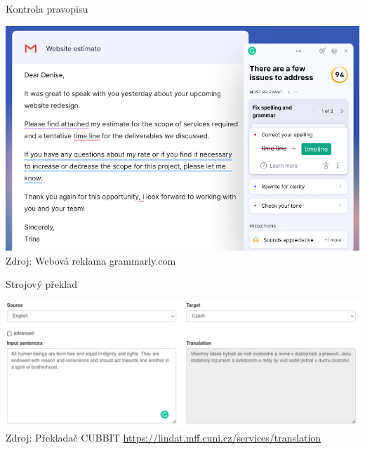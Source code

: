 \documentclass[aspectratio=169,dvipsnames]{beamer}
\begin{document}

\begin{frame}{Kontrola pravopisu}

    \centering
    \includegraphics[scale=.3]{img/grammarly.png} \\
    {\tiny Zdroj: Webová reklama grammarly.com}

\end{frame}


\begin{frame}{Strojový překlad}

    \centering
    \includegraphics[scale=.4]{img/lindat.png} \\
    {\tiny Zdroj: Překladač CUBBIT \url{https://lindat.mff.cuni.cz/services/translation} \citep{popel2020transforming}}

\end{frame}

\end{document}
